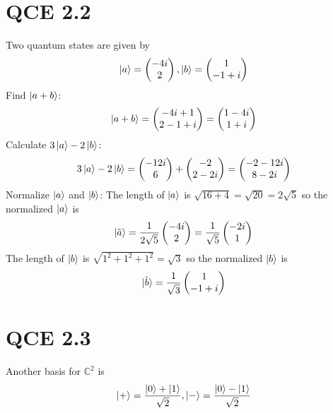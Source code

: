 \documentclass[10pt]{article}
\begin{document}
\section*{QCE 2.2}
Two quantum states are given by 
\[ 
\ket{a} = \begin{pmatrix}
-4i \\
2
\end{pmatrix},
\ket{b} = \begin{pmatrix}
1 \\
-1 + i
\end{pmatrix}
\]
Find $\ket{a + b}$: 
\[
\ket{a + b} = \begin{pmatrix}
-4i + 1 \\
2 - 1 + i
\end{pmatrix}
= \begin{pmatrix}
1 - 4i \\
1 + i
\end{pmatrix}
\]
Calculate $3\ket{a} - 2\ket{b}$:
\[
3\ket{a} - 2 \ket{b} = \begin{pmatrix}
-12i \\
6
\end{pmatrix} +
\begin{pmatrix}
-2 \\
2 - 2i
\end{pmatrix} = 
\begin{pmatrix}
-2 - 12i \\
8 - 2i
\end{pmatrix}
\]
Normalize $\ket{a}$ and $\ket{b}$:
The length of $\ket{a}$ is $\sqrt{16 + 4} = \sqrt{20} = 2\sqrt{5}$ so the normalized $\ket{a}$ is 
\[
\ket{\tilde{a}} = \frac{1}{2\sqrt{5}} \begin{pmatrix}
-4i \\
2
\end{pmatrix} =
\frac{1}{\sqrt{5}}
\begin{pmatrix}
-2i \\
1
\end{pmatrix}
\]
The length of $\ket{b}$ is $\sqrt{1^2 + 1^2 + 1^2} = \sqrt{3}$ so the normalized $\ket{b}$ is
\[
\ket{\tilde{b}} = \frac{1}{\sqrt{3}} 
\begin{pmatrix}
1 \\
-1 + i
\end{pmatrix}
\]

\section*{QCE 2.3}
Another basis for $\mathbb{C}^2$ is
\[
\ket{+} = \frac{\ket{0} + \ket{1}}{\sqrt{2}}, \ket{-} = \frac{\ket{0} - \ket{1}}{\sqrt{2}}
\]
\end{document}
